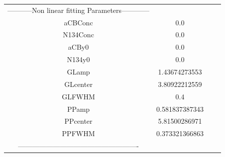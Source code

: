 \documentclass{article}
\begin{document}
\begin{tabular}{c c c c}

-----------Non linear fitting Parameters------------\\
aCBConc    &0.0\\
N134Conc   &0.0\\
aCBy0      &0.0\\
N134y0     &0.0\\
GLamp      &1.43674273553\\
GLcenter   &3.80922212559\\
GLFWHM     &0.4\\
PPamp      &0.581837387343\\
PPcenter   &5.81500286971\\
PPFWHM     &0.373321366863\\
----------------------------------------------------\\


\end{tabular}
\end{document}
